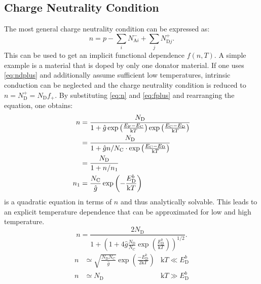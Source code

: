 \subsection{Charge Neutrality Condition}
The most general charge neutrality condition can be expressed as:
\begin{equation}
	n = p -\sum_i N_{\mathrm{A}i}^- + \sum_j N_{\mathrm{D}j}^+.
\end{equation}
This can be used to get an implicit functional dependence $f(n,T)$.
A simple example is a material that is doped by only one donator material.
If one uses \cref{eq:ndplus} and additionally assume sufficient low
temperatures, intrinsic conduction can be neglected and the charge
neutrality condition is reduced to $n = N_\mathrm{D}^+=N_\mathrm{D} f_+$.
By substituting \cref{eq:n} and \cref{eq:fplus} and rearranging the
equation, one obtains:
\begin{align}
	\notag
	n     & =\frac{N_{\mathrm{D}}}{1+\hat{g}
		\exp\left( \frac{E_{\mathrm{F}}-E_{\mathrm{C}}}{\mathrm{k}T} \right)
	\exp\left( \frac{E_{\mathrm{C}}-E_{\mathrm{D}}}{\mathrm{k}T} \right)}                   \\
	\notag
	      & =\frac{N_{\mathrm{D}}}{1+ \hat{g}n /N_{\mathrm{C}}\cdot
	\exp\left( \frac{E_{\mathrm{C}}-E_{\mathrm{D}}}{\mathrm{k}T} \right)} \label{eq:n_quad} \\
	      & =\frac{N_{\mathrm{D}}}{1+n / n_{1}}                                             \\
	n_{1} & =	\frac{N_{\mathrm{C}}}{\hat{g}}
	\exp\left( -\frac{E_{\mathrm{D}}^{b}}{\mathrm{k}T} \right)
\end{align}
 is a quadratic equation in terms of $n$ and thus
analytically solvable.
This leads to an explicit temperature dependence that can be approximated
for low and high temperature. 
\begin{equation}
	\label{eq:n_T}
	n=\frac{2N_{\mathrm{D}}}
	{1+\left( 1+4\hat{g} \frac{N_{\mathrm{D}}}{N_{\mathrm{C}}}
		\exp\left( \frac{E_{\mathrm{D}}^{b}}{\mathrm{k}T} \right) \right)^{1/2}}.
\end{equation}
\begin{align}
	\label{eq:n_T_approx_low}
	n & \simeq \sqrt{ \frac{N_{\mathrm{D}}N_{\mathrm{C}}}{\hat{g}} }
	\exp\left( \frac{-E_{\mathrm{D}}^{b}}{2 \mathrm{k}T} \right) & \mathrm{k}T\ll E_{\mathrm{D}}^{b} \\
	n & \simeq N_{\mathrm{D}} & \mathrm{k}T\gg E_{\mathrm{D}}^{b}
\end{align}

